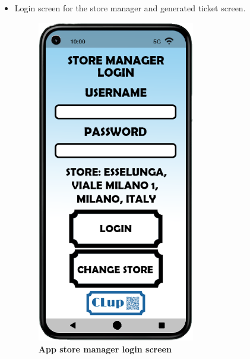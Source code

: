 \begin{itemize}
\begin{figure}[!htb]
\end{figure}
\item Login screen for the store manager and generated ticket screen.
\begin{figure}[!htb]
\centering
\begin{minipage}{0.4\textwidth}
\centering
\includegraphics[width=0.65\textwidth]{Images/App/Android_LoginManager}
\caption{\label{fig:androidlogin}\textbf{App store manager login screen}}
\end{minipage}
\begin{minipage}{0.4\textwidth}
\centering

\end{minipage}
\end{figure}
\end{itemize}
